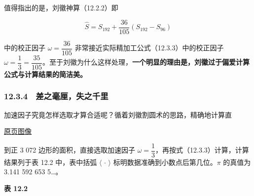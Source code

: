 \documentclass[
  10pt,
  fontset=fandol]{ctexart}
\begin{document}
值得指出的是，刘徽神算（12.2.2）即

\[
\widehat S=S_{192}+\frac{36}{105}(S_{192}-S_{96})
\]

中的校正因子 \(\omega=\dfrac{36}{105}\) 非常接近实际精加工公式（12.3.3）中的校正因子 \(\omega=\dfrac13=\dfrac{35}{105}\)。至于刘徽为什么这样处理，\textbf{一个明显的理由是，刘徽过于偏爱计算公式与计算结果的简洁美。}

\subsubsection{12.3.4　差之毫厘，失之千里}\label{ux5deeux4e4bux6bebux5398ux5931ux4e4bux5343ux91cc}

加速因子究竟怎样选取才算合适呢？循着刘徽割圆术的思路，精确地计算直

\href{../../source-images/pdf-301.jpeg}{原页图像}

到正 3 072 边形的面积，直接选取加速因子 \(\omega=\dfrac13\)，再按式（12.3.3）计算，计算结果列于表 12.2 中，表中括弧 \(\langle\,\cdot\,\rangle\) 标明数据准确到小数点后第几位。\(\pi\) 的真值为 3.141 592 653 5\ldots。

\textbf{表 12.2}
\end{document}
